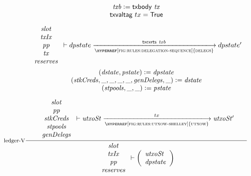 \begin{figure}
  \begin{equation}
    \label{eq:ledger}
    \inference[ledger-V]
    {
      \var{txb}\leteq\txbody{tx} \\
      \fun{txvaltag}~{tx} = \True \\~\\
      {
        \begin{array}{c}
          \var{slot} \\
          \var{txIx} \\
          \var{pp} \\
          \var{tx}\\
          \var{reserves}
        \end{array}
      }
      \vdash
      dpstate \trans{\hyperref[fig:rules:delegation-sequence]{delegs}}{
                     \fun{txcerts}~\var{txb}} dpstate'
      \\~\\
      (\var{dstate}, \var{pstate}) \leteq \var{dpstate} \\
      (\var{stkCreds}, \_, \_, \_, \_, \var{genDelegs}, \_) \leteq \var{dstate} \\
      (\var{stpools}, \_, \_) \leteq \var{pstate} \\
      \\~\\
      {
        \begin{array}{c}
        \var{slot} \\
        \var{pp} \\
        \var{stkCreds} \\
        \var{stpools} \\
        \var{genDelegs} \\
        \end{array}
      }
      \vdash \var{utxoSt} \trans{\hyperref[fig:rules:utxow-shelley]{utxow}}{tx} \var{utxoSt'}
    }
    {
      \begin{array}{c}
        \var{slot} \\
        \var{txIx} \\
        \var{pp} \\
        \var{reserves}
      \end{array}
      \vdash
      \left(
        \begin{array}{ll}
          \var{utxoSt} \\
          \var{dpstate} \\
        \end{array}
      \right)
}
\end{equation}
\end{figure}
